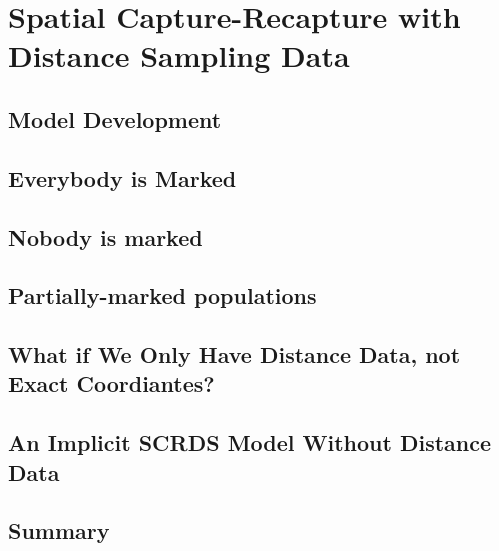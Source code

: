 


\chapter{Spatial Capture-Recapture with Distance Sampling Data}
\label{chapt.scrds}

\section{Model Development}





\section{Everybody is Marked}



\section{Nobody is marked}





\section{Partially-marked populations}




\section{What if We Only Have Distance Data, not Exact Coordiantes?}


\section{An Implicit SCRDS Model Without Distance Data}


\section{Summary}

